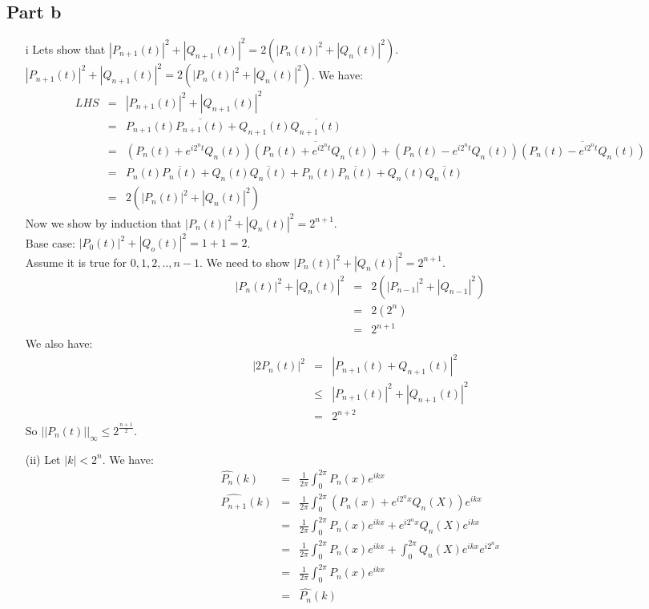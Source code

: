 \documentclass[12pt]{article}
\begin{document}
\subsection*{Part b}
\begin{enumerate}
\item[i] 
Lets show that $|P_{n+1}(t)|^2+|Q_{n+1}(t)|^2=2(|P_n(t)|^2+|Q_n(t)|^2)$.  \\
$|P_{n+1}(t)|^2+|Q_{n+1}(t)|^2=2(|P_n(t)|^2+|Q_n(t)|^2)$. We have:
\begin{eqnarray*}
LHS &=& |P_{n+1}(t)|^2+|Q_{n+1}(t)|^2 \\&=& P_{n+1}(t)\overline{P_{n+1}(t)}+Q_{n+1}(t)\overline{Q_{n+1}(t)} \\ &=&
(P_n(t)+e^{i2^nt}Q_n(t))\overline{(P_n(t)+e^{i2^nt}Q_n(t))} +
(P_n(t)-e^{i2^nt}Q_n(t)) \overline{(P_n(t)-e^{i2^nt}Q_n(t))}
\\ &=&
P_n(t)\overline{P_n(t)}+Q_n(t)\overline{Q_n(t)}+
P_n(t)\overline{P_n(t)}+Q_n(t)\overline{Q_n(t)} \\ &=&
2(|P_n(t)|^2+|Q_n(t)|^2)
\end{eqnarray*}
Now we show by induction that $|P_n(t)|^2+|Q_n(t)|^2=2^{n+1}$.\\
Base case: $|P_0(t)|^2+|Q_o(t)|^2=1+1=2$.\\
Assume it is true for $0,1,2,..,n-1$. We need to show
$|P_n(t)|^2+|Q_n(t)|^2=2^{n+1}$. 
\begin{eqnarray*}
|P_n(t)|^2+|Q_n(t)|^2  &=& 2(|P_{n-1}|^2+|Q_{n-1}|^2) \\&=&
2(2^n) \\ &=&
2^{n+1}
\end{eqnarray*}
We also have:
\begin{eqnarray*}
|2P_n(t)|^2 &=& |P_{n+1}(t)+Q_{n+1}(t)|^2 \\ &\le &
|P_{n+1}(t)|^2+|Q_{n+1}(t)|^2 \\ &=&
2^{n+2}
\end{eqnarray*}
So $||P_n(t)||_{\infty} \le 2^{\frac{n+1}{2}}$.

\item[(ii)]
Let $|k| < 2^n$. We have:
\begin{eqnarray*}
\hat{P_n}(k) &=& \frac{1}{2\pi} \int_0^{2\pi} P_n(x)e^{ikx} \\
\hat{P_{n+1}}(k) &=&
 \frac{1}{2\pi} \int_0^{2\pi} (P_n(x)+e^{i2^nx}Q_n(X))e^{ikx} \\ &=&
\frac{1}{2\pi} \int_0^{2\pi} P_n(x)e^{ikx} +e^{i2^nx}Q_n(X)e^{ikx} \\ &=&
\frac{1}{2\pi} \int_0^{2\pi} P_n(x)e^{ikx} +\int_0^{2\pi} Q_n(X)e^{ikx}e^{i2^nx} 
\\ &=&
\frac{1}{2\pi} \int_0^{2\pi} P_n(x)e^{ikx}  \\ &=&
\hat{P_n}(k)
\end{eqnarray*}
\end{enumerate}




   
\end{document}
